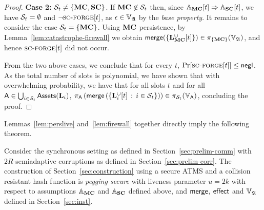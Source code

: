 \begin{proof}
  \textbf{Case 2:}
  $\Secure_t \neq \{\Mainchain,\Sidechain\}$.
  If $\Mainchain\not\in\Secure_t$ then, since
  $\Assum_\Mainchain[t] \Rightarrow \Assum_\Sidechain[t]$, we have $\Secure_t = \emptyset$ and
  $\lnot \textsc{sc-forge}[t]$, as $\epsilon \in \adalang$ by the
  \emph{base property}.
  It remains to consider the case $\Secure_t = \{\Mainchain\}$. Using $\Mainchain$ persistence,
  by Lemma~\ref{lem:catastrophe-firewall} we obtain
  $\merge(\{\Ledger_\Mainchain^{\cup}[t]\}) \in \proj_{\{\Mainchain\}}(\adalang)$,
  and hence $\scforge[t]$ did not occur.

  From the two above cases, we conclude that for every $t$,
  $\Pr[\textsc{sc-forge}[t]] \leq \textsf{negl}$. As the total number of slots is
  polynomial,
  we have shown that with overwhelming probability,
  we have that for all slots $t$ and for all
  $\Asset\in\bigcup_{i\in\Secure_t}\Assets(\Ledger_i)$,
  $
  \proj_{\Asset}\left(
    \merge\left(
      \setd
        {\Ledger_i^{\cup}[t]}
        {i\in\Secure_t}
    \right)
  \right)
  \in
  \proj_{\Secure_t}(\ValLang_\Asset)
  $, concluding the proof.
\end{proof}

  Lemmas~\ref{lem:perslive} and~\ref{lem:firewall} together directly imply the
  following theorem.

\begin{theorem}
  \label{thm:security}
  Consider the synchronous setting as defined in Section~\ref{sec:prelim-comm}
  with $2R$-semiadaptive corruptions as defined in
  Section~\ref{sec:prelim-corr}.  The construction of
  Section~\ref{sec:construction} using a secure ATMS and a collision resistant
  hash function is \textit{pegging secure} with liveness parameter
  $u=2k$
  with respect to
  assumptions $\Assum_\Mainchain$ and $\Assum_\Sidechain$ defined above,
  and $\merge$, $\effect$ and
  $\adalang$ defined in Section~\ref{sec:inst}.
\end{theorem}
